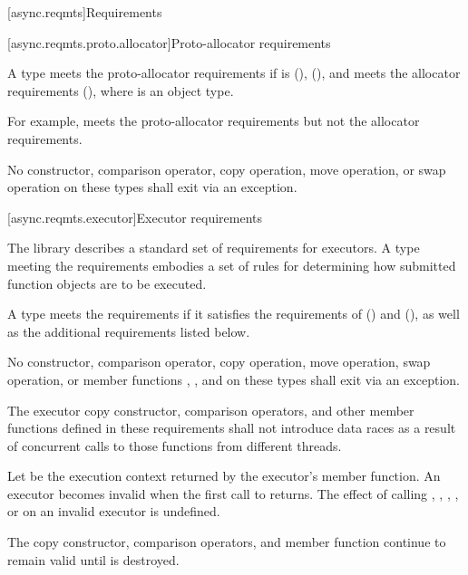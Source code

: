 [async.reqmts]{Requirements}


[async.reqmts.proto.allocator]{Proto-allocator requirements}

\pnum
A type  meets the proto-allocator requirements if  is  (),  (), and  meets the allocator requirements (), where  is an object type. \begin{note} For example,  meets the proto-allocator requirements but not the allocator requirements. \end{note} No constructor, comparison operator, copy operation, move operation, or swap operation on these types shall exit via an exception.



[async.reqmts.executor]{Executor requirements}

\pnum
The library describes a standard set of requirements for executors. A type meeting the  requirements embodies a set of rules for determining how submitted function objects are to be executed.

\pnum
A type  meets the  requirements if it satisfies the requirements of  () and  (), as well as the additional requirements listed below.

\pnum
No constructor, comparison operator, copy operation, move operation, swap operation, or member functions , , and  on these types shall exit via an exception.

\pnum
 The executor copy constructor, comparison operators, and other member functions defined in these requirements shall not introduce data races as a result of concurrent calls to those functions from different threads.

\pnum
Let  be the execution context returned by the executor's  member function. An executor becomes invalid when the first call to  returns. The effect of calling , , , , or  on an invalid executor is undefined. \begin{note} The copy constructor, comparison operators, and  member function continue to remain valid until  is destroyed. \end{note}

